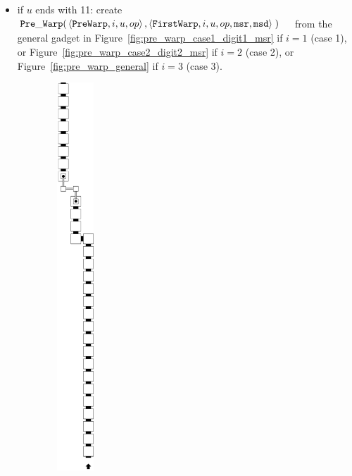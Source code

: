 \begin{itemize}
\begin{itemize}
            \item if $u$ ends with 11:
            create
            $\begin{aligned}[t]
                {\tt Pre\_Warp}(& \left\langle {\tt PreWarp},   i, u, op \right\rangle,
                           \left\langle {\tt FirstWarp}, i, u, op, {\tt msr}, {\tt msd} \right\rangle \;)
            \end{aligned}$ from the general gadget in Figure~\ref{fig:pre_warp_case1_digit1_msr} if $i = 1$ (case 1),
            or Figure~\ref{fig:pre_warp_case2_digit2_msr} if $i = 2$ (case 2), or Figure~\ref{fig:pre_warp_general} if $i = 3$ (case 3).
        \end{itemize}
        \vspace{.5cm}

        \begin{figure}[H]
            \centering
            \begin{subfigure}[t]{0.24\textwidth}
                \centering
                \includegraphics[width=0.15\textwidth]{warping_pre_warp_general}

\end{subfigure}
\end{figure}
\end{itemize}
